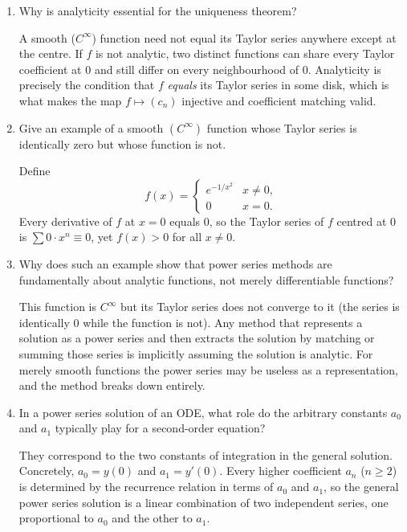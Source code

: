 \documentclass{essay}
\begin{document}
\begin{enumerate}[leftmargin=*, itemsep=8pt]
  \item Why is analyticity essential for the uniqueness theorem?
    \begin{answer}
      A smooth ($C^\infty$) function need not equal its Taylor series
      anywhere except at the centre. If $f$ is not analytic, two
      distinct functions can share every Taylor coefficient at $0$
      and still differ on every neighbourhood of $0$. Analyticity is
      precisely the condition that $f$ \emph{equals} its Taylor
      series in some disk, which is what makes the map $f \mapsto
      (c_n)$ injective and coefficient matching valid.
    \end{answer}

  \item Give an example of a smooth \((C^\infty)\) function whose
    Taylor series is identically zero but whose function is not.
    \begin{answer}
      Define
      \[
        f(x) =
        \begin{cases}
          e^{-1/x^2} & x \neq 0, \\
          0          & x = 0.
        \end{cases}
      \]
      Every derivative of $f$ at $x = 0$ equals $0$, so the Taylor
      series of $f$ centred at $0$ is $\sum 0 \cdot x^n \equiv 0$,
      yet $f(x) > 0$ for all $x \neq 0$.
    \end{answer}

  \item Why does such an example show that power series methods are
    fundamentally about analytic functions, not merely differentiable functions?
    \begin{answer}
      This function is $C^\infty$ but its Taylor series does not
      converge to it (the series is identically $0$ while the
      function is not). Any method that represents a solution as a
      power series and then extracts the solution by matching or
      summing those series is implicitly assuming the solution is
      analytic. For merely smooth functions the power series may be
      useless as a representation, and the method breaks down entirely.
    \end{answer}

  \item In a power series solution of an ODE, what role do the
    arbitrary constants \(a_0\) and \(a_1\) typically play for a
    second-order equation?
    \begin{answer}
      They correspond to the two constants of integration in the
      general solution. Concretely, $a_0 = y(0)$ and $a_1 = y'(0)$.
      Every higher coefficient $a_n$ ($n \ge 2$) is determined by the
      recurrence relation in terms of $a_0$ and $a_1$, so the general
      power series solution is a linear combination of two
      independent series, one proportional to $a_0$ and the other to $a_1$.
    \end{answer}


\end{enumerate}
\end{document}
